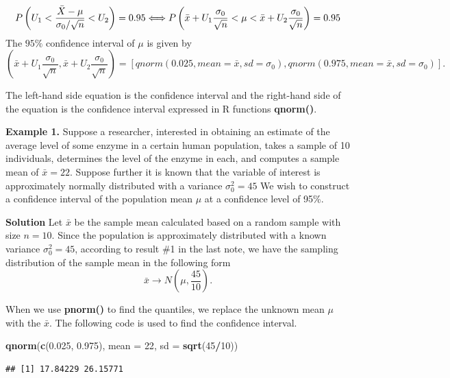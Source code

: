 \documentclass[
]{book}
\newenvironment{Shaded}{\begin{snugshade}}{\end{snugshade}}
\newcommand{\AttributeTok}[1]{\textcolor[rgb]{0.13,0.29,0.53}{#1}}
\newcommand{\DecValTok}[1]{\textcolor[rgb]{0.00,0.00,0.81}{#1}}
\newcommand{\FloatTok}[1]{\textcolor[rgb]{0.00,0.00,0.81}{#1}}
\newcommand{\FunctionTok}[1]{\textcolor[rgb]{0.13,0.29,0.53}{\textbf{#1}}}
\newcommand{\NormalTok}[1]{#1}
\newcommand{\SpecialCharTok}[1]{\textcolor[rgb]{0.81,0.36,0.00}{\textbf{#1}}}
\begin{document}
\[
P\left( U_1<\frac{\bar{X} -\mu}{\sigma_0/\sqrt{n}} <U_2 \right) = 0.95 \Longleftrightarrow \\ P\left(\bar{x}+U_1\frac{\sigma_0}{\sqrt{n}} <\mu< \bar{x}+U_2\frac{\sigma_0}{\sqrt{n}}\right) = 0.95
\]
The \(95\%\) confidence interval of \(\mu\) is given by
\[
\left(\bar{x}+U_1\frac{\sigma_0}{\sqrt{n}}, \bar{x}+U_2\frac{\sigma_0}{\sqrt{n}}\right)=\left[qnorm(0.025, mean =\bar{x}, sd = \sigma_0), qnorm(0.975, mean =\bar{x}, sd = \sigma_0) \right].
\]

The left-hand side equation is the confidence interval and the right-hand side of the equation is the confidence interval expressed in R functions \textbf{qnorm()}.

\textbf{Example 1.} Suppose a researcher, interested in obtaining an estimate of the average level of some enzyme in a certain human population, takes a sample of 10 individuals, determines the level of the enzyme in each, and computes a sample mean of \(\bar{x}=22\). Suppose further it is known that the variable of interest is approximately normally distributed with a variance \(\sigma_0^2=45\) We wish to construct a confidence interval of the population mean \(\mu\) at a confidence level of 95\%.

\textbf{Solution} Let \(\bar{x}\) be the sample mean calculated based on a random sample with size \(n = 10\). Since the population is approximately distributed with a known variance \(\sigma_0^2 = 45\), according to result \#1 in the last note, we have the sampling distribution of the sample mean in the following form
\[
\bar{x} \to N(\mu, \frac{45}{10}).
\]

When we use \textbf{pnorm()} to find the quantiles, we replace the unknown mean \(\mu\) with the \(\bar{x}\). The following code is used to find the confidence interval.

\begin{Shaded}
\begin{Highlighting}[]
\FunctionTok{qnorm}\NormalTok{(}\FunctionTok{c}\NormalTok{(}\FloatTok{0.025}\NormalTok{, }\FloatTok{0.975}\NormalTok{), }\AttributeTok{mean =} \DecValTok{22}\NormalTok{, }\AttributeTok{sd =} \FunctionTok{sqrt}\NormalTok{(}\DecValTok{45}\SpecialCharTok{/}\DecValTok{10}\NormalTok{))}
\end{Highlighting}
\end{Shaded}

\begin{verbatim}
## [1] 17.84229 26.15771
\end{verbatim}
\end{document}
